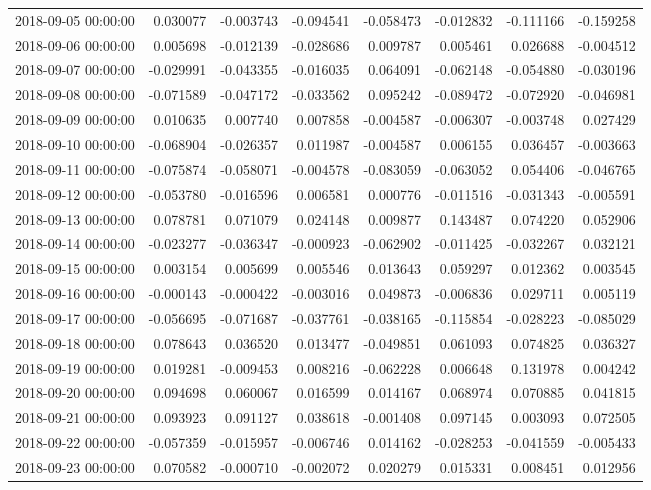 \begin{tabular}{lrrrrrrr}
2018-09-05 00:00:00 & 0.030077 & -0.003743 & -0.094541 & -0.058473 & -0.012832 & -0.111166 & -0.159258 \\
2018-09-06 00:00:00 & 0.005698 & -0.012139 & -0.028686 & 0.009787 & 0.005461 & 0.026688 & -0.004512 \\
2018-09-07 00:00:00 & -0.029991 & -0.043355 & -0.016035 & 0.064091 & -0.062148 & -0.054880 & -0.030196 \\
2018-09-08 00:00:00 & -0.071589 & -0.047172 & -0.033562 & 0.095242 & -0.089472 & -0.072920 & -0.046981 \\
2018-09-09 00:00:00 & 0.010635 & 0.007740 & 0.007858 & -0.004587 & -0.006307 & -0.003748 & 0.027429 \\
2018-09-10 00:00:00 & -0.068904 & -0.026357 & 0.011987 & -0.004587 & 0.006155 & 0.036457 & -0.003663 \\
2018-09-11 00:00:00 & -0.075874 & -0.058071 & -0.004578 & -0.083059 & -0.063052 & 0.054406 & -0.046765 \\
2018-09-12 00:00:00 & -0.053780 & -0.016596 & 0.006581 & 0.000776 & -0.011516 & -0.031343 & -0.005591 \\
2018-09-13 00:00:00 & 0.078781 & 0.071079 & 0.024148 & 0.009877 & 0.143487 & 0.074220 & 0.052906 \\
2018-09-14 00:00:00 & -0.023277 & -0.036347 & -0.000923 & -0.062902 & -0.011425 & -0.032267 & 0.032121 \\
2018-09-15 00:00:00 & 0.003154 & 0.005699 & 0.005546 & 0.013643 & 0.059297 & 0.012362 & 0.003545 \\
2018-09-16 00:00:00 & -0.000143 & -0.000422 & -0.003016 & 0.049873 & -0.006836 & 0.029711 & 0.005119 \\
2018-09-17 00:00:00 & -0.056695 & -0.071687 & -0.037761 & -0.038165 & -0.115854 & -0.028223 & -0.085029 \\
2018-09-18 00:00:00 & 0.078643 & 0.036520 & 0.013477 & -0.049851 & 0.061093 & 0.074825 & 0.036327 \\
2018-09-19 00:00:00 & 0.019281 & -0.009453 & 0.008216 & -0.062228 & 0.006648 & 0.131978 & 0.004242 \\
2018-09-20 00:00:00 & 0.094698 & 0.060067 & 0.016599 & 0.014167 & 0.068974 & 0.070885 & 0.041815 \\
2018-09-21 00:00:00 & 0.093923 & 0.091127 & 0.038618 & -0.001408 & 0.097145 & 0.003093 & 0.072505 \\
2018-09-22 00:00:00 & -0.057359 & -0.015957 & -0.006746 & 0.014162 & -0.028253 & -0.041559 & -0.005433 \\
2018-09-23 00:00:00 & 0.070582 & -0.000710 & -0.002072 & 0.020279 & 0.015331 & 0.008451 & 0.012956 \\

\end{tabular}
